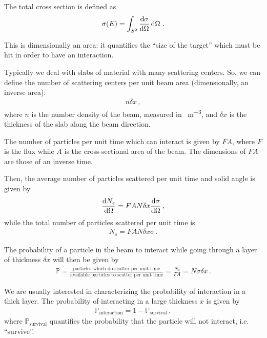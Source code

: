 \documentclass[main.tex]{subfiles}
\begin{document}
The total cross section is defined as 
%
\begin{align}
\sigma (E) = \int_{S^{2}} \dv{\sigma }{\Omega } \dd{\Omega }
\,.
\end{align}

This is dimensionally an area: it quantifies the ``size of the target'' which must be hit in order to have an interaction.

Typically we deal with slabs of material with many scattering centers. 
So, we can define the number of scattering centers per unit beam area (dimensionally, an inverse area): 
%
\begin{align}
n \delta x 
\,,
\end{align}
%
where \(n\) is the number density of the beam, measured in \SI{}{m^{-3}}, and \(\delta x \) is the thickness of the slab along the beam direction.

The number of particles per unit time which can interact is given by \(F A\), where \(F\) is the flux while \(A\) is the cross-sectional area of the beam. 
The dimensions of \(FA\) are those of an inverse time.

Then, the average number of particles scattered per unit time and solid angle is given by 
%
\begin{align}
\dv{N_s}{\Omega } (\Omega ) =  FA N \delta x \dv{\sigma }{\Omega }
\,,
\end{align}
%
while the total number of particles scattered per unit time is 
%
\begin{align}
N_{s} = FA N \delta x \sigma 
\,.
\end{align}

The probability of a particle in the beam to interact while going through a layer of thickness \(\delta x\) will then be given by 
%
\begin{align} \label{eq:probability-of-interaction}
\mathbb{P} = 
\frac{\text{particles which do scatter per unit time}}{\text{available particles to scatter per unit time}}
= \frac{N_s}{FA} = N \sigma  \delta x 
\,.
\end{align}

We are usually interested in characterizing the probability 
of interaction in a thick layer.
The probability of interacting in a large thickness \(x\) is given by 
%
\begin{align}
\mathbb{P} _{\text{interaction}} = 1 - \mathbb{P}_{\text{survival}}
\,,
\end{align}
%
where \(\mathbb{P}_{\text{survival}}\) quantifies the probability that the particle will not interact, i.e. ``survive''. 
\end{document}
